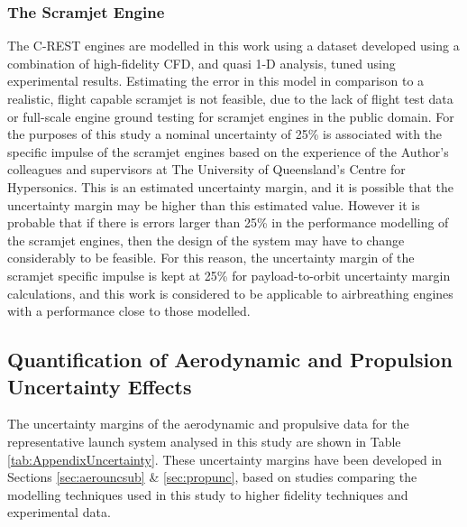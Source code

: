 \subsubsection{The Scramjet Engine}


The C-REST engines are modelled in this work using a dataset developed using a combination of high-fidelity CFD, and quasi 1-D analysis, tuned using experimental results\cite{Jazra2010}. Estimating the error in this model in comparison to a realistic, flight capable scramjet is not feasible, due to the lack of flight test data or full-scale engine ground testing for scramjet engines in the public domain. For the purposes of this study a nominal uncertainty of 25\% is associated with the specific impulse of the scramjet engines based on the experience of the Author's colleagues and supervisors at The University of Queensland's Centre for Hypersonics. This is an estimated uncertainty margin, and it is possible that the uncertainty margin may be higher than this estimated value. However it is probable that if there is errors larger than 25\% in the performance modelling of the scramjet engines, then the design of the system may have to change considerably to be feasible. For this reason, the uncertainty margin of the scramjet specific impulse is kept at 25\% for payload-to-orbit uncertainty margin calculations, and this work is considered to be applicable to airbreathing engines with a performance close to those modelled.


\subsection{Quantification of Aerodynamic and Propulsion Uncertainty Effects}\label{sec:uncquant}

The uncertainty margins of the aerodynamic and propulsive data for the representative launch system analysed in this study are shown in Table \ref{tab:AppendixUncertainty}. These uncertainty margins have been developed in Sections \ref{sec:aerouncsub} \& \ref{sec:propunc}, based on studies comparing the modelling techniques used in this study to higher fidelity techniques and experimental data.  

